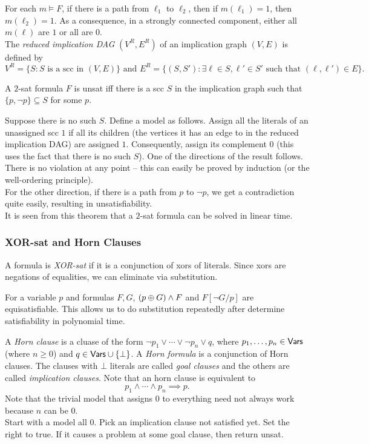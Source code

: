 For each $m\vDash F$, if there is a path from $\ell_1$ to $\ell_2$, then if $m(\ell_1)=1$, then $m(\ell_2)=1$. As a consequence, in a strongly connected component, either all $m(\ell)$ are $1$ or all are $0$.\\

The \textit{reduced implication DAG} $(V^R,E^R)$ of an implication graph $(V,E)$ is defined by
\[ V^R = \{S : S\text{ is a scc in }(V,E)\}\text{ and }E^R = \{(S,S') : \exists \ell\in S,\ell'\in S' \text{ such that }(\ell,\ell')\in E \}. \]

\begin{theorem}
	A $2$-sat formula $F$ is unsat iff there is a scc $S$ in the implication graph such that $\{p,\neg p\}\subseteq S$ for some $p$.
\end{theorem}

	Suppose there is no such $S$. Define a model as follows. Assign all the literals of an unassigned scc $1$ if all its children (the vertices it has an edge to in the reduced implication DAG) are assigned $1$. Consequently, assign its complement $0$ (this uses the fact that there is no such $S$). One of the directions of the result follows. There is no violation at any point -- this can easily be proved by induction (or the well-ordering principle).\\
	For the other direction, if there is a path from $p$ to $\neg p$, we get a contradiction quite easily, resulting in unsatisfiability.\\

It is seen from this theorem that a $2$-sat formula can be solved in linear time.

\subsubsection{XOR-sat and Horn Clauses}

A formula is \textit{XOR-sat} if it is a conjunction of xors of literals. Since xors are negations of equalities, we can eliminate via substitution.

For a variable $p$ and formulas $F,G$, $(p\oplus G)\wedge F$ and $F[\neg G/p]$ are equisatisfiable. This allows us to do substitution repeatedly after determine satisfiability in polynomial time.

A \textit{Horn clause} is a cluase of the form $\neg p_1\lor \cdots\lor\neg p_n \lor q$, where $p_1,\ldots,p_n\in\mathsf{Vars}$ (where $n\geq 0$) and $q\in\mathsf{Vars}\cup\{\bot\}$. A \textit{Horn formula} is a conjunction of Horn clauses. The clauses with $\bot$ literals are called \textit{goal clauses} and the others are called \textit{implication clauses}. Note that an horn clause is equivalent to
\[ p_1 \land \cdots \land p_n \implies p. \]
Note that the trivial model that assigns $0$ to everything need not always work because $n$ can be $0$.\\
Start with a model all $0$. Pick an implication clause not satisfied yet. Set the right to true. If it causes a problem at some goal clause, then return unsat.

